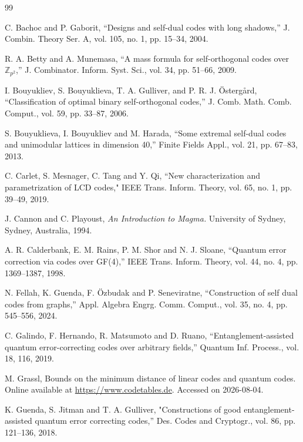\documentclass{article}
\theoremstyle{definition}
\theoremstyle{remark}
\begin{document}
\begin{thebibliography}{99}


 C. Bachoc and P. Gaborit, “Designs and self-dual codes with long shadows,” J. Combin. Theory Ser. A, vol. 105, no. 1, pp. 15--34, 2004.

 R. A. Betty and A. Munemasa, “A mass formula for self-orthogonal codes over $\mathbb{Z}_{p^2}$,” J. Combinator. Inform. Syst. Sci., vol. 34, pp. 51--66, 2009.

 I. Bouyukliev, S. Bouyuklieva, T. A. Gulliver, and P. R. J. \"Osterg{\aa}rd, “Classification of optimal binary self-orthogonal codes,'' J. Comb. Math. Comb. Comput., vol. 59, pp. 33--87, 2006.

 S. Bouyuklieva, I. Bouyukliev and M. Harada, “Some extremal self-dual codes and unimodular lattices in dimension 40,” Finite Fields Appl., vol. 21, pp. 67--83, 2013.

 C. Carlet, S. Mesnager, C. Tang and Y. Qi, ``New characterization and parametrization of LCD codes," IEEE Trans. Inform. Theory, vol. 65, no. 1, pp. 39--49, 2019.

 J. Cannon and C. Playoust, {\it An Introduction to Magma.} University of Sydney, Sydney, Australia, 1994.

 A. R. Calderbank, E. M. Rains, P. M. Shor and N. J. Sloane, “Quantum error correction via codes over GF(4),” IEEE Trans. Inform. Theory, vol. 44, no. 4, pp. 1369--1387, 1998.

 N. Fellah, K. Guenda, F. Özbudak and P. Seneviratne, “Construction of self dual codes from graphs,” Appl. Algebra Engrg. Comm. Comput., vol. 35, no. 4, pp. 545--556, 2024.

 C. Galindo, F. Hernando, R. Matsumoto and D. Ruano, “Entanglement-assisted quantum error-correcting codes over arbitrary fields,” Quantum Inf. Process., vol. 18, 116, 2019.

 M. Grassl, Bounds on the minimum distance of linear codes and quantum codes.
Online available at \url{https://www.codetables.de}. Accessed on 2026-08-04.

K. Guenda, S. Jitman and T. A. Gulliver, "Constructions of good entanglement-assisted quantum error correcting codes,'' Des. Codes and Cryptogr., vol. 86, pp. 121--136, 2018.


\end{thebibliography}
\end{document}

